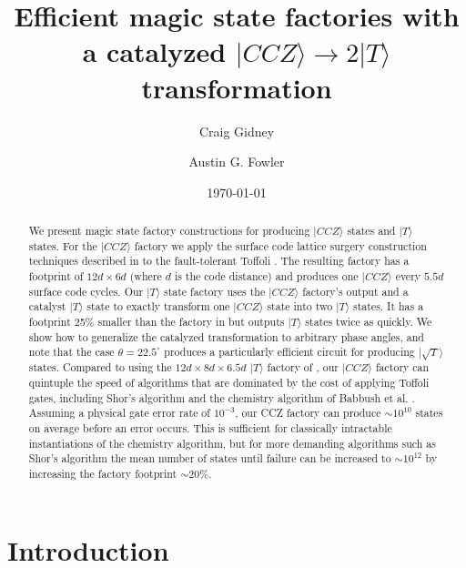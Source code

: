 \documentclass[superscriptaddress,notitlepage,longbibliography]{revtex4-1}
\begin{document}
\title{\texorpdfstring{
Efficient magic state factories with a catalyzed $|CCZ\rangle \rightarrow 2|T\rangle$ transformation
}{
Efficient magic state factories with a catalyzed CCZ to 2T transformation
}}

\date{\today}
\author{Craig Gidney}
\author{Austin G. Fowler}

\begin{abstract}
We present magic state factory constructions for producing $|CCZ\rangle$ states and $|T\rangle$ states.
For the $|CCZ\rangle$ factory we apply the surface code lattice surgery construction techniques described in \cite{fowler2018} to the fault-tolerant Toffoli \cite{jones2013, eastin2013distilling}.
The resulting factory has a footprint of $12d \times 6d$ (where $d$ is the code distance) and produces one $|CCZ\rangle$ every $5.5d$ surface code cycles.
Our $|T\rangle$ state factory uses the $|CCZ\rangle$ factory's output and a catalyst $|T\rangle$ state to exactly transform one $|CCZ\rangle$ state into two $|T\rangle$ states.
It has a footprint 25\% smaller than the factory in \cite{fowler2018} but outputs $|T\rangle$ states twice as quickly.
We show how to generalize the catalyzed transformation to arbitrary phase angles, and note that the case $\theta=22.5^\circ$ produces a particularly efficient circuit for producing $|\sqrt{T}\rangle$ states.
Compared to using the $12d \times 8d \times 6.5d$ $|T\rangle$ factory of \cite{fowler2018}, our $|CCZ\rangle$ factory can quintuple the speed of algorithms that are dominated by the cost of applying Toffoli gates, including Shor's algorithm \cite{shor1994} and the chemistry algorithm of Babbush et al. \cite{babbush2018}.
Assuming a physical gate error rate of $10^{-3}$, our CCZ factory can produce $\sim 10^{10}$ states on average before an error occurs.
This is sufficient for classically intractable instantiations of the chemistry algorithm, but for more demanding algorithms such as Shor's algorithm the mean number of states until failure can be increased to $\sim 10^{12}$ by increasing the factory footprint $\sim 20\%$.
\end{abstract}

\maketitle


\section{Introduction}
\label{sec:introduction}
\end{document}
